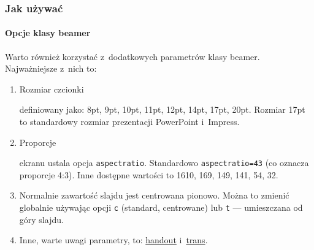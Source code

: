\documentclass[12pt,aspectratio=169,ignorenonframetext]{beamer}
\begin{document}
\begin{frame}
 \frametitle<presentation>{Jak używać}
 \framesubtitle{Opcje klasy beamer}
 Warto również korzystać z~dodatkowych parametrów klasy beamer. Najważniejsze z~nich to:
 \begin{enumerate}
  \item
        \hypertarget{fontsize}{Rozmiar czcionki} definiowany jako:  \alert{8pt}, \alert{9pt}, 10pt, 11pt, 12pt, \alert{14pt}, \alert{17pt}, \alert{20pt}. Rozmiar 17pt to standardowy rozmiar prezentacji PowerPoint i~Impress.
  \item
        \hypertarget{proporcje}{Proporcje} ekranu ustala opcja \lstinline|aspectratio|. Standardowo \lstinline|aspectratio=43| (co oznacza proporcje 4:3). Inne dostępne wartości to 1610, 169, 149, 141, 54, 32.

  \item
        Normalnie zawartość slajdu jest centrowana pionowo. Można to zmienić globalnie używając opcji \lstinline|c| (standard, centrowane) lub \lstinline|t| — umieszczana od góry slajdu.
  \item
        Inne, warte uwagi parametry, to: \hyperlink{sec:handout}{handout} i~\hyperlink{sec:trans}{trans}.
 \end{enumerate}
\end{frame}
\end{document}
